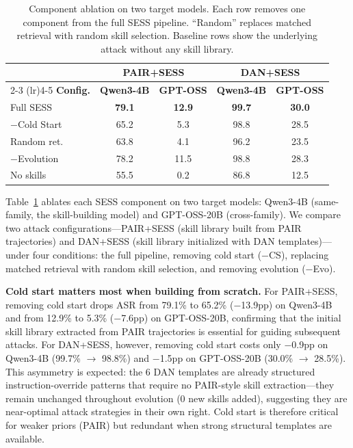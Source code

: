 \documentclass[letterpaper]{article}
\begin{document}
\begin{table}[t]
\centering
\caption{Component ablation on two target models. Each row removes one component from the full SESS pipeline. ``Random'' replaces matched retrieval with random skill selection. Baseline rows show the underlying attack without any skill library.}
\label{tab:ablation}
\footnotesize
\setlength{\tabcolsep}{2.5pt}
\begin{tabular}{lcccc}
\toprule
& \multicolumn{2}{c}{\textbf{PAIR+SESS}} & \multicolumn{2}{c}{\textbf{DAN+SESS}} \\
\cmidrule(lr){2-3} \cmidrule(lr){4-5}
\textbf{Config.} & \textbf{Qwen3-4B} & \textbf{GPT-OSS} & \textbf{Qwen3-4B} & \textbf{GPT-OSS} \\
\midrule
Full SESS & \textbf{79.1} & \textbf{12.9} & \textbf{99.7} & \textbf{30.0} \\
\quad $-$Cold Start & 65.2 & 5.3 & 98.8 & 28.5 \\
\quad Random ret. & 63.8 & 4.1 & 96.2 & 23.5 \\
\quad $-$Evolution & 78.2 & 11.5 & 98.8 & 28.3 \\
\midrule
No skills & 55.5 & 0.2 & 86.8 & 12.5 \\
\bottomrule
\end{tabular}
\end{table}

Table~\ref{tab:ablation} ablates each SESS component on two target models: Qwen3-4B (same-family, the skill-building model) and GPT-OSS-20B (cross-family). We compare two attack configurations---PAIR+SESS (skill library built from PAIR trajectories) and DAN+SESS (skill library initialized with DAN templates)---under four conditions: the full pipeline, removing cold start ($-$CS), replacing matched retrieval with random skill selection, and removing evolution ($-$Evo).

\textbf{Cold start matters most when building from scratch.} For PAIR+SESS, removing cold start drops ASR from 79.1\% to 65.2\% ($-$13.9pp) on Qwen3-4B and from 12.9\% to 5.3\% ($-$7.6pp) on GPT-OSS-20B, confirming that the initial skill library extracted from PAIR trajectories is essential for guiding subsequent attacks. For DAN+SESS, however, removing cold start costs only $-$0.9pp on Qwen3-4B (99.7\% $\to$ 98.8\%) and $-$1.5pp on GPT-OSS-20B (30.0\% $\to$ 28.5\%). This asymmetry is expected: the 6 DAN templates are already structured instruction-override patterns that require no PAIR-style skill extraction---they remain unchanged throughout evolution (0 new skills added), suggesting they are near-optimal attack strategies in their own right. Cold start is therefore critical for weaker priors (PAIR) but redundant when strong structural templates are available.
\end{document}
